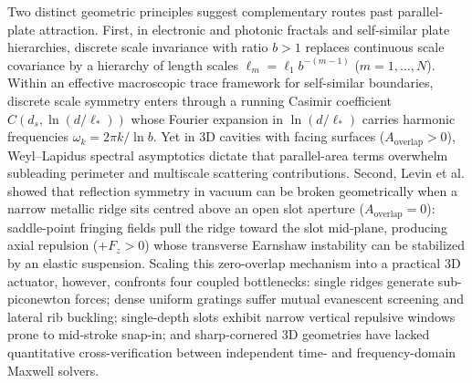 \documentclass[pdflatex,sn-nature]{sn-jnl}
\begin{document}
Two distinct geometric principles suggest complementary routes past parallel-plate attraction. First, in electronic and photonic fractals\cite{kempkes2019,xu2021,nuckolls2025} and self-similar plate hierarchies\cite{akkermans2010,shajesh2016,shajesh2017}, discrete scale invariance with ratio $b>1$ replaces continuous scale covariance by a hierarchy of length scales $\ell_m = \ell_1 b^{-(m-1)}$ ($m=1,\dots,N$). Within an effective macroscopic trace framework for self-similar boundaries\cite{milton2004,milton2016,gordon2026prd}, discrete scale symmetry enters through a running Casimir coefficient $C(d_s,\ln(d/\ell_*))$ whose Fourier expansion in $\ln(d/\ell_*)$ carries harmonic frequencies $\omega_k = 2\pi k/\ln b$. Yet in 3D cavities with facing surfaces ($A_{\mathrm{overlap}}>0$), Weyl--Lapidus spectral asymptotics\cite{lapidus1991} dictate that parallel-area terms overwhelm subleading perimeter and multiscale scattering contributions. Second, Levin et al.\cite{levin2010} showed that reflection symmetry in vacuum can be broken geometrically when a narrow metallic ridge sits centred above an open slot aperture ($A_{\mathrm{overlap}}=0$): saddle-point fringing fields pull the ridge toward the slot mid-plane, producing axial repulsion ($+F_z>0$) whose transverse Earnshaw instability can be stabilized by an elastic suspension\cite{levin2010,rodriguez2011}. Scaling this zero-overlap mechanism into a practical 3D actuator, however, confronts four coupled bottlenecks: single ridges generate sub-piconewton forces; dense uniform gratings suffer mutual evanescent screening and lateral rib buckling; single-depth slots exhibit narrow vertical repulsive windows prone to mid-stroke snap-in; and sharp-cornered 3D geometries have lacked quantitative cross-verification between independent time- and frequency-domain Maxwell solvers.
\end{document}
